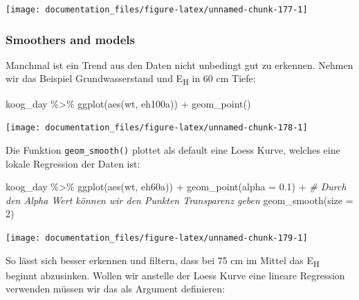 \documentclass[
]{article}
\newenvironment{Shaded}{\begin{snugshade}}{\end{snugshade}}
\newcommand{\AttributeTok}[1]{\textcolor[rgb]{0.77,0.63,0.00}{#1}}
\newcommand{\CommentTok}[1]{\textcolor[rgb]{0.56,0.35,0.01}{\textit{#1}}}
\newcommand{\DecValTok}[1]{\textcolor[rgb]{0.00,0.00,0.81}{#1}}
\newcommand{\FloatTok}[1]{\textcolor[rgb]{0.00,0.00,0.81}{#1}}
\newcommand{\FunctionTok}[1]{\textcolor[rgb]{0.00,0.00,0.00}{#1}}
\newcommand{\NormalTok}[1]{#1}
\newcommand{\SpecialCharTok}[1]{\textcolor[rgb]{0.00,0.00,0.00}{#1}}
\begin{document}
\begin{center}\texttt{[image: documentation\_files/figure-latex/unnamed-chunk-177-1]} \end{center}

\hypertarget{smoothers-and-models}{%
\subsubsection{Smoothers and models}\label{smoothers-and-models}}

Manchmal ist ein Trend aus den Daten nicht unbedingt gut zu erkennen. Nehmen wir das Beispiel Grundwasserstand und E\textsubscript{H} in 60 cm Tiefe:

\begin{Shaded}
\begin{Highlighting}[]
\NormalTok{koog\_day  }\SpecialCharTok{\%\textgreater{}\%}
  \FunctionTok{ggplot}\NormalTok{(}\FunctionTok{aes}\NormalTok{(wt, eh100a)) }\SpecialCharTok{+}
  \FunctionTok{geom\_point}\NormalTok{()}
\end{Highlighting}
\end{Shaded}

\begin{center}\texttt{[image: documentation\_files/figure-latex/unnamed-chunk-178-1]} \end{center}

Die Funktion \texttt{geom\_smooth()} plottet als default eine Loess Kurve, welches eine lokale Regression der Daten ist:

\begin{Shaded}
\begin{Highlighting}[]
\NormalTok{koog\_day  }\SpecialCharTok{\%\textgreater{}\%}
  \FunctionTok{ggplot}\NormalTok{(}\FunctionTok{aes}\NormalTok{(wt, eh60a)) }\SpecialCharTok{+}
  \FunctionTok{geom\_point}\NormalTok{(}\AttributeTok{alpha =} \FloatTok{0.1}\NormalTok{) }\SpecialCharTok{+} \CommentTok{\# Durch den Alpha Wert können wir den Punkten Transparenz geben}
  \FunctionTok{geom\_smooth}\NormalTok{(}\AttributeTok{size =} \DecValTok{2}\NormalTok{)}
\end{Highlighting}
\end{Shaded}

\begin{center}\texttt{[image: documentation\_files/figure-latex/unnamed-chunk-179-1]} \end{center}

So lässt sich besser erkennen und filtern, dass bei 75 cm im Mittel das E\textsubscript{H} beginnt abzusinken. Wollen wir anstelle der Loess Kurve eine lineare Regression verwenden müssen wir das als Argument definieren:
\end{document}
